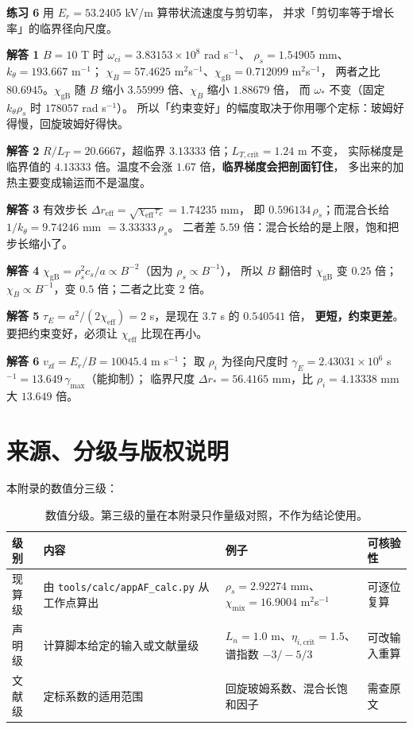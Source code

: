 \textbf{练习 6} 用 $E_r=53.2405$ kV/m 算带状流速度与剪切率，
并求「剪切率等于增长率」的临界径向尺度。

\textbf{解答 1} $B=10$ T 时 $\omega_{ci}=3.83153\times10^{8}$ rad s$^{-1}$、
$\rho_s=1.54905$ mm、$k_\theta=193.667$ m$^{-1}$；
$\chi_B=57.4625$ m$^2$s$^{-1}$、$\chi_{\mathrm{gB}}=0.712099$ m$^2$s$^{-1}$，
两者之比 $80.6945$。$\chi_{\mathrm{gB}}$ 随 $B$ 缩小 $3.55999$ 倍、$\chi_B$ 缩小 $1.88679$ 倍，
而 $\omega_*$ 不变（固定 $k_\theta\rho_s$ 时 $178057$ rad s$^{-1}$）。
所以「约束变好」的幅度取决于你用哪个定标：玻姆好得慢，回旋玻姆好得快。

\textbf{解答 2} $R/L_T=20.6667$，超临界 $3.13333$ 倍；$L_{T,\mathrm{crit}}=1.24$ m 不变，
实际梯度是临界值的 $4.13333$ 倍。温度不会涨 $1.67$ 倍，\textbf{临界梯度会把剖面钉住}，
多出来的加热主要变成输运而不是温度。

\textbf{解答 3} 有效步长 $\Delta r_{\mathrm{eff}}=\sqrt{\chi_{\mathrm{eff}}\tau_c}=1.74235$ mm，
即 $0.596134\,\rho_s$；而混合长给 $1/k_\theta=9.74246$ mm $=3.33333\,\rho_s$。
二者差 $5.59$ 倍：混合长给的是上限，饱和把步长缩小了。

\textbf{解答 4} $\chi_{\mathrm{gB}}=\rho_s^2c_s/a\propto B^{-2}$（因为 $\rho_s\propto B^{-1}$），
所以 $B$ 翻倍时 $\chi_{\mathrm{gB}}$ 变 $0.25$ 倍；$\chi_B\propto B^{-1}$，变 $0.5$ 倍；二者之比变 $2$ 倍。

\textbf{解答 5} $\tau_E=a^2/(2\chi_{\mathrm{eff}})=2$ s，是现在 $3.7$ s 的 $0.540541$ 倍，
\textbf{更短，约束更差}。要把约束变好，必须让 $\chi_{\mathrm{eff}}$ 比现在再小。

\textbf{解答 6} $v_{\mathrm{zf}}=E_r/B=10045.4$ m s$^{-1}$；
取 $\rho_i$ 为径向尺度时 $\gamma_E=2.43031\times10^{6}$ s$^{-1}=13.649\,\gamma_{\max}$（能抑制）；
临界尺度 $\Delta r_*=56.4165$ mm，比 $\rho_i=4.13338$ mm 大 $13.649$ 倍。

\section{来源、分级与版权说明}
\label{sec:app-af-source}

\begingroup\small
本附录的数值分三级：

\begin{table}[htbp]
\centering
\small
\caption{数值分级。第三级的量在本附录只作量级对照，不作为结论使用。}
\label{tab:app-af-source}
\begin{tabular}{p{2.6cm}p{4.2cm}p{2.6cm}p{4.4cm}}
\toprule
级别 & 内容 & 例子 & 可核验性 \\
\midrule
现算级 & 由 \texttt{tools/\allowbreak{}calc/\allowbreak{}appAF\_calc.py} 从工作点算出 & $\rho_s=2.92274$ mm、$\chi_{\mathrm{mix}}=16.9004$ m$^2$s$^{-1}$ & 可逐位复算 \\
声明级 & 计算脚本给定的输入或文献量级 & $L_n=1.0$ m、$\eta_{i,\mathrm{crit}}=1.5$、谱指数 $-3/-5/3$ & 可改输入重算 \\
文献级 & 定标系数的适用范围 & 回旋玻姆系数、混合长饱和因子 & 需查原文 \\
\bottomrule
\end{tabular}

\end{table}

